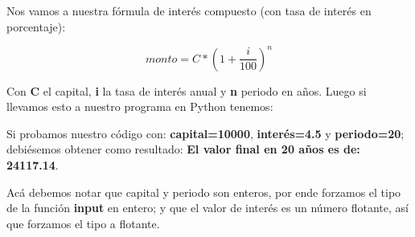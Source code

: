 \begin{enumerate}[{Ejercicio} 1.]
        \asw Nos vamos a nuestra fórmula de interés compuesto (con tasa de interés en porcentaje):

        \[ monto = C * (1 + \frac{i}{100})^{n} \]

        Con \textbf{C} el capital, \textbf{i} la tasa de interés anual y \textbf{n} periodo en años. Luego si llevamos esto a nuestro programa en Python tenemos:\\

        \begin{listing}[H]
        \end{listing}

        Si probamos nuestro código con: \textbf{capital=10000}, \textbf{interés=4.5} y \textbf{periodo=20}; debiésemos obtener como resultado: \textbf{El valor final en 20 años es de: 24117.14}.

        Acá debemos notar que capital y periodo son enteros, por ende forzamos el tipo de la función \textbf{input} en entero; y que el valor de interés es un número flotante, así que forzamos el tipo a flotante.
    \end{enumerate}
